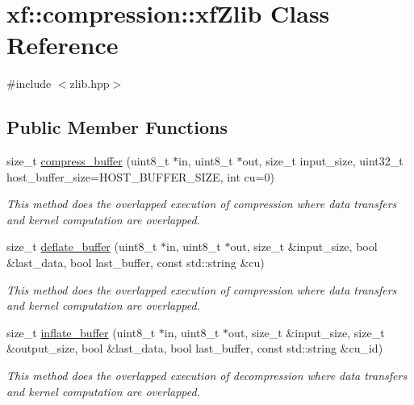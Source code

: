\hypertarget{classxf_1_1compression_1_1xfZlib}{\section{xf\-:\-:compression\-:\-:xf\-Zlib Class Reference}
\label{classxf_1_1compression_1_1xfZlib}
}


{\ttfamily \#include $<$zlib.\-hpp$>$}

\subsection*{Public Member Functions}
\begin{DoxyCompactItemize}
\item 
size\-\_\-t \hyperlink{classxf_1_1compression_1_1xfZlib_aac31d05070fc44eaa7b73e39d1e55387}{compress\-\_\-buffer} (uint8\-\_\-t $\ast$in, uint8\-\_\-t $\ast$out, size\-\_\-t input\-\_\-size, uint32\-\_\-t host\-\_\-buffer\-\_\-size=H\-O\-S\-T\-\_\-\-B\-U\-F\-F\-E\-R\-\_\-\-S\-I\-Z\-E, int cu=0)
\begin{DoxyCompactList}\small\item\em This method does the overlapped execution of compression where data transfers and kernel computation are overlapped. \end{DoxyCompactList}\item 
size\-\_\-t \hyperlink{classxf_1_1compression_1_1xfZlib_aa6fc980499fbe77fb8c760362140cc97}{deflate\-\_\-buffer} (uint8\-\_\-t $\ast$in, uint8\-\_\-t $\ast$out, size\-\_\-t \&input\-\_\-size, bool \&last\-\_\-data, bool last\-\_\-buffer, const std\-::string \&cu)
\begin{DoxyCompactList}\small\item\em This method does the overlapped execution of compression where data transfers and kernel computation are overlapped. \end{DoxyCompactList}\item 
size\-\_\-t \hyperlink{classxf_1_1compression_1_1xfZlib_a42d55d344807bb9cce3df23de903efdc}{inflate\-\_\-buffer} (uint8\-\_\-t $\ast$in, uint8\-\_\-t $\ast$out, size\-\_\-t \&input\-\_\-size, size\-\_\-t \&output\-\_\-size, bool \&last\-\_\-data, bool last\-\_\-buffer, const std\-::string \&cu\-\_\-id)
\begin{DoxyCompactList}\small\item\em This method does the overlapped execution of decompression where data transfers and kernel computation are overlapped. \end{DoxyCompactList}\item 

\end{DoxyCompactItemize}
